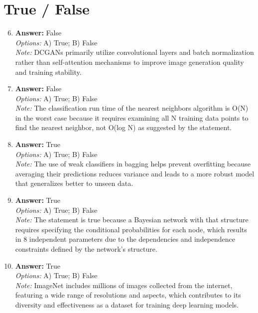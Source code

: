\documentclass[12pt]{article}
\begin{document}
\section*{True / False}
\begin{enumerate}[label=\arabic*.]
\setcounter{enumi}{5}
\item \textbf{Answer:} False
\\ \textit{Options:} A) True; B) False
\\ \textit{Note:} DCGANs primarily utilize convolutional layers and batch normalization rather than self-attention mechanisms to improve image generation quality and training stability.
\item \textbf{Answer:} False
\\ \textit{Options:} A) True; B) False
\\ \textit{Note:} The classification run time of the nearest neighbors algorithm is O(N) in the worst case because it requires examining all N training data points to find the nearest neighbor, not O(log N) as suggested by the statement.
\item \textbf{Answer:} True
\\ \textit{Options:} A) True; B) False
\\ \textit{Note:} The use of weak classifiers in bagging helps prevent overfitting because averaging their predictions reduces variance and leads to a more robust model that generalizes better to unseen data.
\item \textbf{Answer:} True
\\ \textit{Options:} A) True; B) False
\\ \textit{Note:} The statement is true because a Bayesian network with that structure requires specifying the conditional probabilities for each node, which results in 8 independent parameters due to the dependencies and independence constraints defined by the network's structure.
\item \textbf{Answer:} True
\\ \textit{Options:} A) True; B) False
\\ \textit{Note:} ImageNet includes millions of images collected from the internet, featuring a wide range of resolutions and aspects, which contributes to its diversity and effectiveness as a dataset for training deep learning models.
\end{enumerate}
\end{document}
